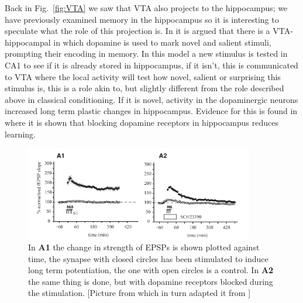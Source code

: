\documentclass[11pt,a4paper]{scrartcl}
\begin{document}
Back in Fig.~\ref{fig:VTA} we saw that VTA also projects to the
hippocampus; we have previously examined memory in the hippocampus so
it is interesting to speculate what the role of this projection is. In
\cite{LismanGrace2005a} it is argued that there is a VTA-hippocampal
in which dopamine is used to mark novel and salient stimuli, prompting
their encoding in memory. In this model a new stimulus is tested in
CA1 to see if it is already stored in hippocampus, if it isn't, this
is communicated to VTA where the local activity will test how novel,
salient or surprising this stimulus is, this is a role akin to, but
slightly different from the role described above in classical
conditioning. If it is novel, activity in the dopaminergic neurons
increased long term plastic changes in hippocampus. Evidence for this
is found in \cite{MorrisEtAl2003a} where it is shown that blocking dopamine receptors
in hippocampus reduces learning.


\begin{figure}
\begin{center}
\includegraphics[width=10cm]{dopamine_learning.png}
\end{center}
\caption{In \textbf{A1} the change in strength of EPSPs is shown
  plotted against time, the synapse with closed circles has been
  stimulated to induce long term potentiation, the one with open
  circles is a control. In \textbf{A2} the same thing is done, but
  with dopamine receptors blocked during the stimulation. [Picture
    from \cite{LismanGrace2005a} which in turn adapted it from
    \cite{MorrisEtAl2003a}]\label{fig:hippocampus}}
\end{figure}
\end{document}
